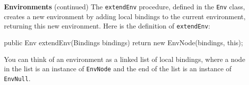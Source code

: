 \begin{minipage}[t]{\sw}
\slidenumber
\LARGE
{\bf Environments} (continued)\exx
The \verb'extendEnv' procedure, defined in the \verb'Env' class,
creates a new environment by adding local bindings
to the current environment,
returning this new environment.
Here is the definition of \verb'extendEnv':
\begin{qv}
public Env extendEnv(Bindings bindings) {
    return new EnvNode(bindings, this);
}
\end{qv}
You can think of an environment as a linked list
of local bindings,
where a node in the list is an instance of \verb'EnvNode'
and the end of the list is an instance of \verb'EnvNull'.
\end{minipage}
